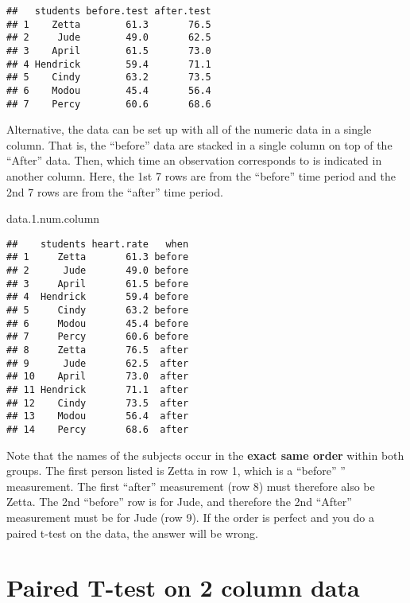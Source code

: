 \documentclass[
]{book}
\newenvironment{Shaded}{\begin{snugshade}}{\end{snugshade}}
\newcommand{\FloatTok}[1]{\textcolor[rgb]{0.00,0.00,0.81}{#1}}
\newcommand{\NormalTok}[1]{#1}
\begin{document}
\begin{verbatim}
##   students before.test after.test
## 1    Zetta        61.3       76.5
## 2     Jude        49.0       62.5
## 3    April        61.5       73.0
## 4 Hendrick        59.4       71.1
## 5    Cindy        63.2       73.5
## 6    Modou        45.4       56.4
## 7    Percy        60.6       68.6
\end{verbatim}

Alternative, the data can be set up with all of the numeric data in a single column. That is, the ``before'' data are stacked in a single column on top of the ``After'' data. Then, which time an observation corresponds to is indicated in another column. Here, the 1st 7 rows are from the ``before'' time period and the 2nd 7 rows are from the ``after'' time period.

\begin{Shaded}
\begin{Highlighting}[]
\NormalTok{data.}\FloatTok{1.}\NormalTok{num.column}
\end{Highlighting}
\end{Shaded}

\begin{verbatim}
##    students heart.rate   when
## 1     Zetta       61.3 before
## 2      Jude       49.0 before
## 3     April       61.5 before
## 4  Hendrick       59.4 before
## 5     Cindy       63.2 before
## 6     Modou       45.4 before
## 7     Percy       60.6 before
## 8     Zetta       76.5  after
## 9      Jude       62.5  after
## 10    April       73.0  after
## 11 Hendrick       71.1  after
## 12    Cindy       73.5  after
## 13    Modou       56.4  after
## 14    Percy       68.6  after
\end{verbatim}

Note that the names of the subjects occur in the \textbf{exact same order} within both groups. The first person listed is Zetta in row 1, which is a ``before'' '' measurement. The first ``after'' measurement (row 8) must therefore also be Zetta. The 2nd ``before'' row is for Jude, and therefore the 2nd ``After'' measurement must be for Jude (row 9). If the order is perfect and you do a paired t-test on the data, the answer will be wrong.

\hypertarget{paired-t-test-on-2-column-data}{%
\chapter{Paired T-test on 2 column data}\label{paired-t-test-on-2-column-data}}
\end{document}
